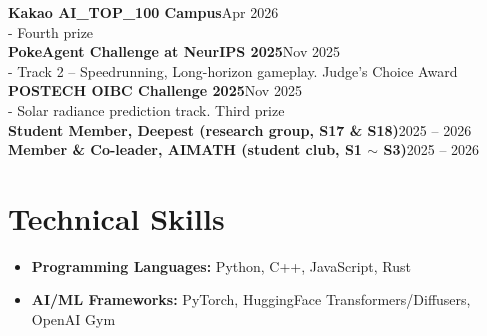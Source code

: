 \documentclass[11pt,a4paper]{article}
\newcommand{\cvitem}[2]{\textbf{#1}\hfill #2\\}
\newcommand{\cvsubitem}[1]{\hspace*{1.2em}#1\\}
\begin{document}
\cvitem{Kakao AI\_TOP\_100 Campus}{Apr 2026}
\cvsubitem{- Fourth prize}
\cvitem{PokeAgent Challenge at NeurIPS 2025}{Nov 2025}
\cvsubitem{- Track 2 -- Speedrunning, Long-horizon gameplay. Judge's Choice Award}
\cvitem{POSTECH OIBC Challenge 2025}{Nov 2025}
\cvsubitem{- Solar radiance prediction track. Third prize}

\cvitem{Student Member, Deepest (research group, S17 \& S18)}{2025 -- 2026}
\cvitem{Member \& Co-leader, AIMATH (student club, S1 $\sim$ S3)}{2025 -- 2026}

\section*{Technical Skills}
\begin{itemize}
	\item \textbf{Programming Languages:} Python, C++, JavaScript, Rust
	\item \textbf{AI/ML Frameworks:}
	      PyTorch, HuggingFace Transformers/Diffusers, OpenAI Gym
\end{itemize}
\end{document}
